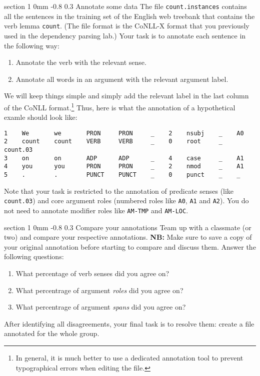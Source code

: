 \documentclass[11pt]{article}
\makeatletter
\newcommand{\newsec}[2]{\section{#1}\label{sec:#2}\noindent}
\renewcommand{\section}{\@startsection
{section}%
{1}%
{0mm}%
{-0.8\baselineskip}%
{0.3\baselineskip}%
{\bfseries\large}}%
\makeatother
\begin{document}
\newsec{Annotate some data }{annotate}%
The file {\tt count.instances} contains all the sentences in the
training set of the English web treebank that contains the verb lemma
{\tt count}. (The file format is the CoNLL-X format that you
previously used in the dependency parsing lab.) Your task is to
annotate each sentence in the following way:
\begin{enumerate}[noitemsep,topsep=0.2cm]
\item  Annotate the verb with the relevant sense.
\item  Annotate all words in an argument with the relevant argument label.
\end{enumerate}
We will keep things simple and simply add the relevant label in the
last column of the CoNLL format.\footnote{In general, it is much
  better to use a dedicated annotation tool to prevent typographical
  errors when editing the file.}  Thus, here is what the annotation of
a hypothetical examle should look like:
\begin{Verbatim}[fontsize=\small,xleftmargin=\parindent]
1    We       we       PRON     PRON     _    2    nsubj    _    A0
2    count    count    VERB     VERB     _    0    root     _    count.03
3    on       on       ADP      ADP      _    4    case     _    A1
4    you      you      PRON     PRON     _    2    nmod     _    A1
5    .        .        PUNCT    PUNCT    _    0    punct    _    _
\end{Verbatim}
Note that your task is restricted to the annotation of predicate
senses (like {\tt count.03}) and core argument roles (numbered roles
like {\tt A0}, {\tt A1} and {\tt A2}). You do not need to annotate
modifier roles like {\tt AM-TMP} and {\tt AM-LOC}.

\newsec{Compare your annotations }{compare}%
Team up with a classmate (or two) and compare your respective
annotations. {\bf NB:} Make sure to save a copy of your original
annotation before starting to compare and discuss them.  Answer the
following questions:
\begin{enumerate}[noitemsep,topsep=0.2cm]
\item  What percentage of verb senses did you agree on? 
\item  What percentrage of argument {\em roles} did you agree on?
\item  What percentrage of argument {\em spans} did you agree on?
\end{enumerate}
After identifying all disagreements, your final task is to resolve
them: create a file annotated for the whole group.
\end{document}
